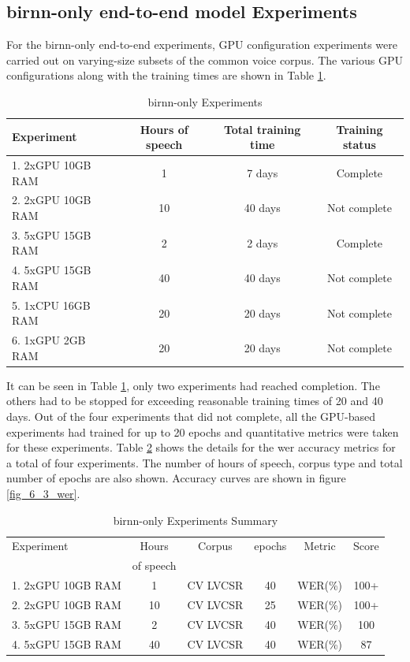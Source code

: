 \subsection{\acrshort{birnn}-only end-to-end model Experiments}
For the \acrshort{birnn}-only end-to-end experiments, GPU configuration experiments were carried out on varying-size subsets of the common voice corpus.   The various GPU configurations along with the training times are shown in Table \ref{tab_c6_01_training}.

\begin{table}
  \caption{\acrshort{birnn}-only Experiments}
  \label{tab_c6_01_training}
\begin{tabular}{lccc}
\toprule
Experiment & Hours of speech & Total training time & Training status\\
\midrule
1. 2xGPU 10GB RAM & 1 & 7 days & Complete\\
2. 2xGPU 10GB RAM & 10 & 40 days & Not complete\\
3. 5xGPU 15GB RAM & 2 & 2 days & Complete\\
4. 5xGPU 15GB RAM & 40 & 40 days & Not complete\\
5. 1xCPU 16GB RAM & 20 & 20 days & Not complete\\
6. 1xGPU 2GB RAM & 20 & 20 days & Not complete\\
\bottomrule
\end{tabular}
\end{table}

It can be seen in Table \ref{tab_c6_01_training}, only two experiments had reached completion.    The others had to be stopped for exceeding reasonable training times of 20 and 40 days. Out of the four experiments that did not complete, all the GPU-based experiments had trained for up to 20 epochs and quantitative metrics were taken for these experiments.  Table \ref{tab_c6_02_training} shows the details for the \acrfull{wer} accuracy metrics for a total of four experiments. The number of hours of speech, corpus type and total number of epochs are also shown. Accuracy curves are shown in figure \ref{fig_6_3_wer}.

\begin{table}
  \caption{\acrshort{birnn}-only Experiments Summary}
  \label{tab_c6_02_training}
\begin{tabular}{lccccc}
\toprule
Experiment & Hours & Corpus & epochs & Metric & Score\\& of speech\\
\midrule
1. 2xGPU 10GB RAM & 1 & CV LVCSR & 40 & WER(\%) & 100+\\
2. 2xGPU 10GB RAM & 10 & CV LVCSR & 25 & WER(\%) & 100+\\
3. 5xGPU 15GB RAM & 2 & CV LVCSR & 40 & WER(\%) & 100\\
4. 5xGPU 15GB RAM & 40 &  CV LVCSR & 40 & WER(\%) & 87\\
\bottomrule
\end{tabular}
\end{table}


